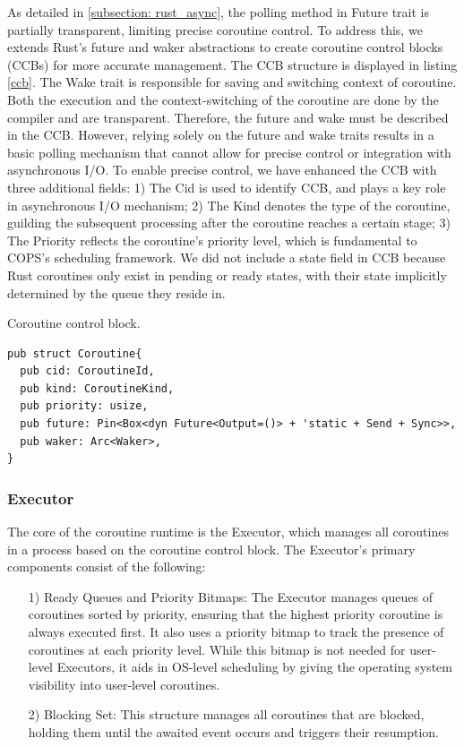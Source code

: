 \documentclass[conference]{IEEEtran}
\begin{document}
As detailed in \ref{subsection: rust_async}, the polling method in Future trait is partially transparent, limiting precise coroutine control. To address this, we extends Rust's future and waker abstractions to create coroutine control blocks (CCBs) for more accurate management. The CCB structure is displayed in listing \ref{ccb}. The Wake trait is responsible for saving and switching context of coroutine. Both the execution and the context-switching of the coroutine are done by the compiler and are transparent. Therefore, the future and wake must be described in the CCB. However, relying solely on the future and wake traits results in a basic polling mechanism that cannot allow for precise control or integration with asynchronous I/O. To enable precise control, we have enhanced the CCB with three additional fields: 1) The Cid is used to identify CCB, and plays a key role in asynchronous I/O mechanism; 2) The Kind denotes the type of the coroutine, guilding the subsequent processing after the coroutine reaches a certain stage; 3) The Priority reflects the coroutine's priority level, which is fundamental to COPS's scheduling framework. We did not include a state field in CCB because Rust coroutines only exist in pending or ready states, with their state implicitly determined by the queue they reside in.


\begin{listing}
\caption{Coroutine control block.}
\label{ccb}
\begin{mdframed}
\begin{verbatim}
pub struct Coroutine{
  pub cid: CoroutineId,
  pub kind: CoroutineKind,
  pub priority: usize,
  pub future: Pin<Box<dyn Future<Output=()> + 'static + Send + Sync>>, 
  pub waker: Arc<Waker>,
}
\end{verbatim}
\end{mdframed}
\end{listing}

\subsubsection{Executor}
\label{subsubsection: executor}

The core of the coroutine runtime is the Executor, which manages all coroutines in a process based on the coroutine control block. The Executor's primary components consist of the following:

\begin{itemize}[leftmargin=*]
    \item[1)] Ready Queues and Priority Bitmaps: The Executor manages queues of coroutines sorted by priority, ensuring that the highest priority coroutine is always executed first. It also uses a priority bitmap to track the presence of coroutines at each priority level. While this bitmap is not needed for user-level Executors, it aids in OS-level scheduling by giving the operating system visibility into user-level coroutines.
    \item[2)] Blocking Set: This structure manages all coroutines that are blocked, holding them until the awaited event occurs and triggers their resumption.
\end{itemize}
\end{document}
